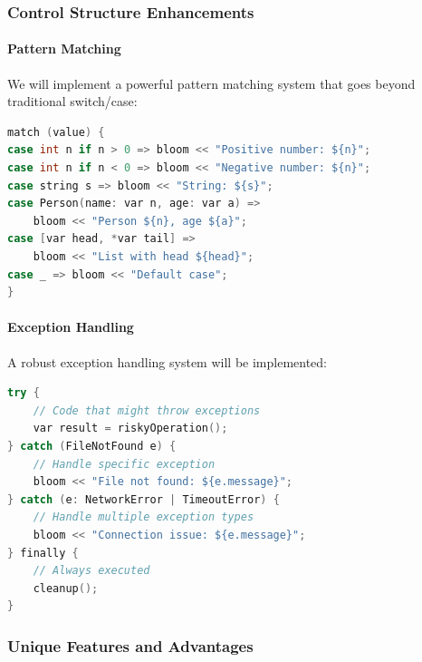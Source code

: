 \documentclass[conference]{IEEEtran}
\begin{document}
\subsubsection{Control Structure Enhancements}
\paragraph{Pattern Matching}
We will implement a powerful pattern matching system that goes beyond traditional switch/case:
\begin{lstlisting}[language=C++, caption={Planned pattern matching example}, label={lst:planned_pattern_matching}, basicstyle=\ttfamily\scriptsize, columns=flexible]
match (value) {
case int n if n > 0 => bloom << "Positive number: ${n}";
case int n if n < 0 => bloom << "Negative number: ${n}";
case string s => bloom << "String: ${s}";
case Person(name: var n, age: var a) =>
    bloom << "Person ${n}, age ${a}";
case [var head, *var tail] =>
    bloom << "List with head ${head}";
case _ => bloom << "Default case";
}
\end{lstlisting}
\paragraph{Exception Handling}
A robust exception handling system will be implemented:
\begin{lstlisting}[language=C++, caption={Planned exception handling example}, label={lst:planned_exception_handling}, basicstyle=\ttfamily\scriptsize, columns=flexible]
try {
    // Code that might throw exceptions
    var result = riskyOperation();
} catch (FileNotFound e) {
    // Handle specific exception
    bloom << "File not found: ${e.message}";
} catch (e: NetworkError | TimeoutError) {
    // Handle multiple exception types
    bloom << "Connection issue: ${e.message}";
} finally {
    // Always executed
    cleanup();
}
\end{lstlisting}
\subsubsection{Unique Features and Advantages}
\end{document}

